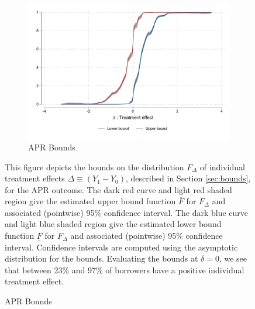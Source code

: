 \begin{appendix}
\begin{figure}[!h]
   \caption{Fan \& Park bounds for benefit in APR\%.}
    \begin{center}
    \begin{subfigure}{0.65\textwidth}
        \caption{APR Bounds}
        \centering
        \includegraphics[width=\textwidth]{Figuras/fan_park_bounds_apr.pdf}
    \end{subfigure}
    \end{center}
          \footnotesize{This figure depicts the \cite{fan2010sharp} bounds on the distribution $F_\Delta$ of individual treatment effects $\Delta \equiv (Y_1 - Y_0)$, described in Section \ref{sec:bounds}, for the APR outcome.
    The dark red curve and light red shaded region give the estimated upper bound function $\overline{F}$ for $F_\Delta$ and associated (pointwise) 95\% confidence interval. 
    The dark blue curve and light blue shaded region give the estimated lower bound function $\underline{F}$ for $F_\Delta$ and associated (pointwise) 95\% confidence interval.
    Confidence intervals are computed using the asymptotic distribution for the bounds.  Evaluating the bounds at $\delta = 0$, we see that between 23\% and 97\% of borrowers have a positive individual treatment effect.}
     \label{fan_park_bounds}
\end{figure}


\end{appendix}
